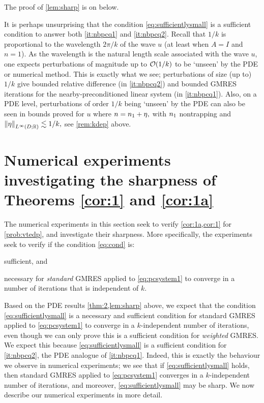 The proof of \cref{lem:sharp} is on  below.

\label{rem:physical1k}
It is perhaps unsurprising that the condition \cref{eq:sufficientlysmall} is a sufficient condition to answer both \cref{it:nbpcq1} and \cref{it:nbpcq2}. Recall that $1/k$ is proportional to the wavelength $2\pi/k$ of the wave $u$ (at least when $A=I$ and $n=1$). As the wavelength is the natural length scale associated with the wave $u$, one expects perturbations of magnitude up to $\mathcal O(1/k)$ to be `unseen' by the PDE or numerical method. This is exactly what we see; perturbations of size (up to) $1/k$ give bounded relative difference (in \cref{it:nbpcq2}) and bounded GMRES iterations for the nearby-preconditioned linear system (in \cref{it:nbpcq1}). Also, on a PDE level, perturbations of order $1/k$ being `unseen' by the PDE can also be seen in bounds proved for $u$ where $n = n_{1} + \eta,$ with $n_{1}$ nontrapping and $\NLiDRR{\eta} \lesssim 1/k,$ see \cref{rem:kdep} above.
\ere


\section[Numerical experiments investigating sharpness]{Numerical experiments investigating the sharpness of Theorems {\ref{cor:1}} and {\ref{cor:1a}}}\label{sec:num}

The numerical experiments in this section seek to verify \cref{cor:1a,cor:1} for \cref{prob:vtedp}, and investigate their sharpness. More specifically, the experiments seek to verify if the condition \cref{eq:cond} is:
\ben
\item sufficient, and
\item necessary
  \een
  for \emph{standard} GMRES applied to \cref{eq:pcsystem1} to converge in a number of iterations that is independent of $k.$

Based on the PDE results \cref{thm:2,lem:sharp} above, we expect that the condition \cref{eq:sufficientlysmall} is a necessary and sufficient condition for standard GMRES applied to \cref{eq:pcsystem1} to converge in a $k$-independent number of iterations, even though we can only prove this is a sufficient condition for \emph{weighted} GMRES. We expect this because \cref{eq:sufficientlysmall} is a sufficient condition for \cref{it:nbpcq2}, the PDE analogue of \cref{it:nbpcq1}. Indeed, this is exactly the behaviour we observe in numerical experiments; we see that if \cref{eq:sufficientlysmall} holds, then standard GMRES applied to \cref{eq:pcsystem1} converges in a $k$-independent number of iterations, and moreover, \cref{eq:sufficientlysmall} may be sharp. We now describe our numerical experiments in more detail.

